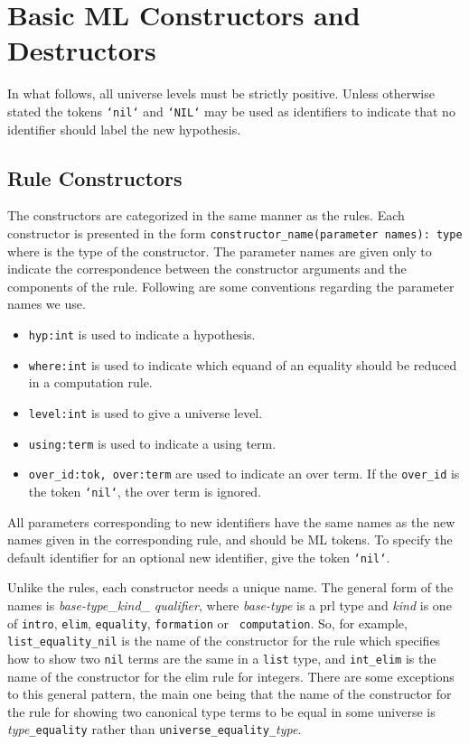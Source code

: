 \chapter{Basic ML Constructors and Destructors}

\label{MLExts}

In what follows, all universe levels must be strictly positive.  Unless
otherwise stated the tokens {\tt `nil`} and {\tt `NIL`} may be used as
identifiers to indicate that no identifier should label the new hypothesis.


\section{Rule Constructors}
The constructors are categorized
in the same manner as the rules.
Each constructor is presented in the form
\mbox{\tt constructor\_name(parameter names): type} where  is the
type of the constructor.  The parameter names are given only to indicate the
correspondence between the constructor arguments and the components of the
rule.
Following are some conventions regarding the parameter names we use.
\begin{itemize}
\item{\tt hyp:int} is used to indicate a hypothesis.
\item{\tt where:int} is used to indicate which equand of an equality should be
reduced in a computation rule.
\item{\tt level:int} is used to give a universe level.
\item{\tt using:term} is used to indicate a using term.
\item{\tt over\_id:tok, over:term} are used to indicate an over term.
If the {\tt over\_id} is the token {\tt `nil`}, the over term is ignored.
\end{itemize}
All parameters corresponding to new identifiers have the same names as the
new names given in the corresponding rule, and should be ML tokens.
To specify the default identifier for an optional new identifier, give the
token {\tt `nil`}.

Unlike the rules, each constructor needs a unique name.
The general form of the names is {\em base-type}\_{\em kind}\_{\em
qualifier}, where {\em base-type} is a prl type and {\em kind} is one of
{\tt intro}, {\tt elim}, {\tt equality}, {\tt formation} or {\tt
computation}.
So, for example, {\tt list\_equality\_nil} is the name of the constructor for
the rule which specifies how to show two {\tt nil} terms are the same in a
{\tt list} type, and {\tt int\_elim} is the name of the constructor for the elim
rule for integers.
There are some exceptions to this general pattern, the main one being that
the name of the constructor for the rule for showing two canonical type
terms to be equal in some universe is {\em type}{\tt \_equality} rather than
{\tt universe\_equality\_}{\em type}.


